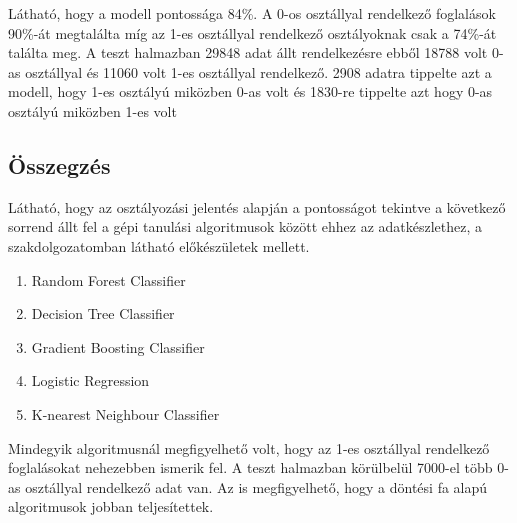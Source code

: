 \bigskip

Látható, hogy a modell pontossága 84\%. A 0-os osztállyal rendelkező foglalások 90\%-át megtalálta míg az 1-es osztállyal rendelkező osztályoknak csak a 74\%-át találta meg. A teszt halmazban 29848 adat állt rendelkezésre ebből 18788 volt 0-as osztállyal és 11060 volt 1-es osztállyal rendelkező. 2908 adatra tippelte azt a modell, hogy 1-es osztályú miközben 0-as volt és 1830-re tippelte azt hogy 0-as osztályú miközben 1-es volt

\subsection{Összegzés}

Látható, hogy az osztályozási jelentés alapján a pontosságot tekintve a következő sorrend állt fel a gépi tanulási algoritmusok között ehhez az adatkészlethez, a szakdolgozatomban látható előkészületek mellett.
\begin{enumerate}
    \item Random Forest Classifier
    \item Decision Tree Classifier
    \item Gradient Boosting Classifier
    \item Logistic Regression
    \item K-nearest Neighbour Classifier
\end{enumerate}

Mindegyik algoritmusnál megfigyelhető volt, hogy az 1-es osztállyal rendelkező foglalásokat nehezebben ismerik fel. A teszt halmazban körülbelül 7000-el több 0-as osztállyal rendelkező adat van. Az is megfigyelhető, hogy a döntési fa alapú algoritmusok jobban teljesítettek.
